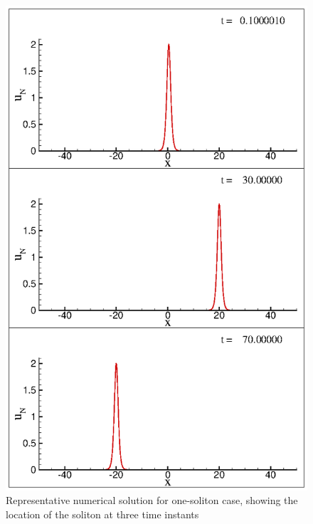 \documentclass{svjour3}                    %
\begin{document}
\begin{figure}
\centerline{
\includegraphics[width=0.5\linewidth]{Fig_11}
}
\caption{Representative numerical solution for one-soliton case, showing the location of the soliton at three time instants}
\label{fig:one0}
\end{figure}
\end{document}
